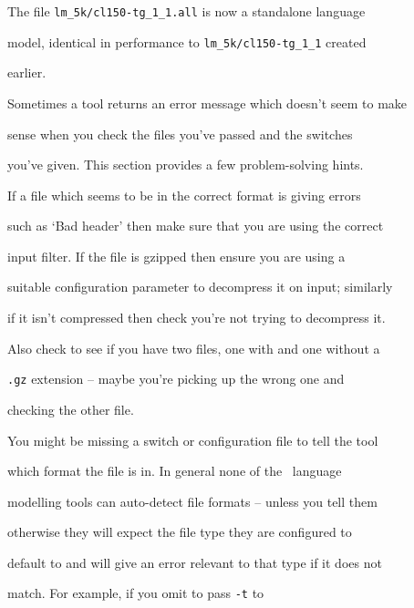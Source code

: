 The file {\tt lm\_5k/cl150-tg\_1\_1.all} is now a standalone language


model, identical in performance to {\tt lm\_5k/cl150-tg\_1\_1} created


earlier.












Sometimes a tool returns an error message which doesn't seem to make


sense when you check the files you've passed and the switches


you've given.  This section provides a few problem-solving hints.







If a file which seems to be in the correct format is giving errors


such as `Bad header' then make sure that you are using the correct


input filter.  If the file is gzipped then ensure you are using a


suitable configuration parameter to decompress it on input; similarly


if it isn't compressed then check you're not trying to decompress it.


Also check to see if you have two files, one with and one without a


{\tt .gz} extension -- maybe you're picking up the wrong one and


checking the other file.





You might be missing a switch or configuration file to tell the tool


which format the file is in.  In general none of the \HTK\ language


modelling tools can auto-detect file formats -- unless you tell them


otherwise they will expect the file type they are configured to


default to and will give an error relevant to that type if it does not


match.  For example, if you omit to pass {\tt -t} to 


